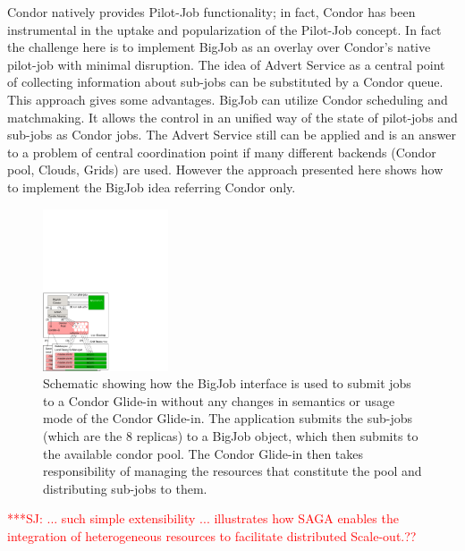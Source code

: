 \documentclass[conference,final]{IEEEtran}
\newcommand{\jhanote}[1]{ {\textcolor{red} { ***SJ: #1 }}}
\newcommand{\jhanote}[1]{}
\begin{document}
Condor natively provides Pilot-Job functionality; in fact, Condor has
been instrumental in the uptake and popularization of the Pilot-Job
concept.
In fact the challenge here is to implement BigJob as an overlay over
Condor's native pilot-job with minimal disruption. The idea of Advert
Service as a central point of collecting information about sub-jobs
can be substituted by a Condor queue. This approach gives some
advantages.  BigJob can utilize Condor scheduling and matchmaking. It
allows the control in an unified way of the state of pilot-jobs and
sub-jobs as Condor jobs. The Advert Service still can be applied and
is an answer to a problem of central coordination point if many
different backends (Condor pool, Clouds, Grids) are used.  However the
approach presented here shows how to implement the BigJob idea
referring Condor only.

\begin{figure}[!ht]
 \begin{center}
     \includegraphics[width=0.33\textwidth]{figures/bigjob_condor}
 \end{center}
 \caption{\small Schematic showing how the BigJob interface is used to
   submit jobs to a Condor Glide-in without any changes in semantics
   or usage mode of the Condor Glide-in. The application submits the
   sub-jobs (which are the 8 replicas) to a BigJob object, which then
   submits to the available condor pool. The Condor Glide-in then
   takes responsibility of managing the resources that constitute the
   pool and distributing sub-jobs to them.} \label{fig:saga-condor}
\end{figure}

\jhanote{... such simple extensibility ... illustrates how SAGA
  enables the integration of heterogeneous resources to facilitate
  distributed Scale-out.??}
\end{document}

